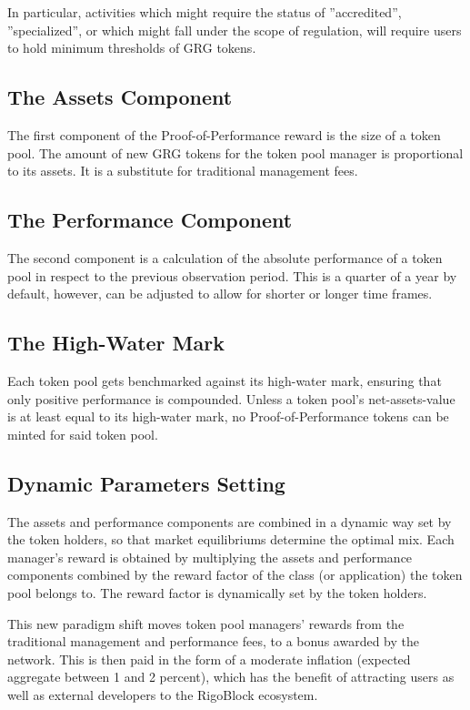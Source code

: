 \documentclass[9pt,oneside]{amsart}
\begin{document}
\begin{multicols}{2}
In particular, activities which might require the status of ”accredited”, ”specialized”, or which might fall under the scope of regulation, will require users to hold minimum thresholds of GRG tokens.

\subsection{The Assets Component}
The first component of the Proof-of-Performance reward is the size of a token pool. The amount of new GRG tokens for the token pool manager is proportional to its assets. It is a substitute for traditional management fees. 

\subsection{The Performance Component}
The second component is a calculation of the absolute performance of a token pool in respect to the previous observation period.  This is a quarter of a year by default, however, can be adjusted to allow for shorter or longer time frames.

\subsection{The High-Water Mark}
Each token pool gets benchmarked against its high-water mark, ensuring that only positive performance is compounded. Unless a token pool’s net-assets-value is at least equal to its high-water mark, no Proof-of-Performance tokens can be minted for said token pool.

\subsection{Dynamic Parameters Setting}
The assets and performance components are combined in a dynamic way set by the token holders, so that market equilibriums determine the optimal mix. Each manager’s reward is obtained by multiplying the assets and performance components combined by the reward factor of the class (or application) the token pool belongs to. The reward factor is dynamically set by the token holders. 

This new paradigm shift moves token pool managers’ rewards from the traditional management and performance fees, to a bonus awarded by the network. This is then paid in the form of a moderate inflation (expected aggregate between 1 and 2 percent), which has the benefit of attracting users as well as external developers to the RigoBlock ecosystem. 


\end{multicols}
\end{document}
